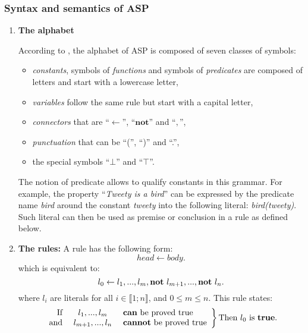 \subsubsection{Syntax and semantics of ASP}
\label{sectionSyntaxeASP}
\begin{enumerate}

\item \textbf{The alphabet}

According to \cite{baral2003knowledge}, the alphabet of ASP is composed of seven classes of symbols:
\begin{itemize}
  \item \emph{constants}, symbols of \emph{functions} and symbols of \emph{predicates} are composed of letters and start with a lowercase letter,
  \item \emph{variables} follow the same rule but start with a capital letter,
  \item \emph{connectors} that are “$\leftarrow$”, “$\textbf{not}$” and “$,$”,
  \item \emph{punctuation} that can be “(”, “)” and “.”,
  \item the special symbols “$\bot$” and “$\top$”.
\end{itemize}

The notion of predicate allows to qualify constants in this grammar.
For example, the property “\textit{Tweety is a bird}”
can be expressed by the predicate name \textit{bird}
around the constant \textit{tweety} into the following literal:
\textit{bird(tweety)}.
Such literal can then be used as premise or conclusion in a rule as defined below.

\item \textbf{The rules:}
A rule has the following form:
\begin{equation} \label{eq1ASP}
 head \leftarrow body.
\end{equation}
which is equivalent to:
\begin{equation} \label{eq2ASP}
l_{0} \leftarrow l_{1},...,l_{m}, \textbf{not}~ l_{m+1},..., \textbf{not}~ l_{n}.
\end{equation}
where $l_{i}$ are literals for all $i \in \llbracket 1 ; n \rrbracket$, and $0 \leq m \leq n$.
This rule states:
\[
\left.
    \begin{array}{rcl}
        \text{If } & l_{1},...,l_{m}  & \text{ \textbf{can} be proved true}\\
        \text{and } & l_{m+1},...,l_{n} & \text{ \textbf{cannot} be proved true}
    \end{array}
\right \} \text{Then} ~ l_{0} ~ \text{is } \textbf{true}.
\]


\end{enumerate}
